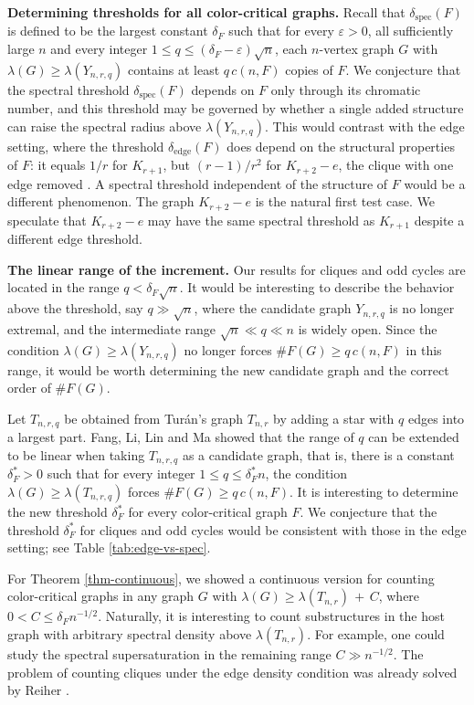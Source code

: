 \documentclass[11pt,a4paper]{article}
\theoremstyle{definition}
\theoremstyle{plain}
\newcommand{\eps}{\varepsilon}
\renewcommand{\le}{\leqslant}
\renewcommand{\ge}{\geqslant}
\begin{document}
\medskip
\noindent\textbf{Determining thresholds for all
color-critical graphs.} 
Recall that 
$\delta_{\mathrm{spec}}(F)$  is defined to be the largest constant $\delta_F$
such that for every $\eps>0$, all sufficiently large
$n$ and every integer $1\le q\le
(\delta_F -\eps)\sqrt n$, each $n$-vertex
graph $G$ with $\lambda(G)\ge\lambda(Y_{n,r,q})$ contains at
least $q\,c(n,F)$ copies of $F$. 
We conjecture that the spectral threshold $\delta_{\mathrm{spec}}(F)$ depends on $F$ only through its chromatic number, and 
this threshold may be governed by whether a single added structure can raise the spectral radius above $\lambda(Y_{n,r,q})$. 
This would contrast with the edge setting, where
the threshold $\delta_{\mathrm{edge}}(F)$ does depend on the  structural properties of $F$: it equals
$1/r$ for $K_{r+1}$, but $(r-1)/r^2$ for $K_{r+2}-e$, the clique with one edge removed \cite{PY2017}. 
A spectral threshold independent of the structure of $F$ 
would be a different phenomenon. 
The graph $K_{r+2}-e$ is
the natural first test case. 
We speculate that $K_{r+2}-e$ may have the same spectral threshold as $K_{r+1}$ despite a different edge threshold. 

\medskip
\noindent\textbf{The linear range of the increment.}
Our results for cliques and odd cycles are located in the range $q< \delta_{F} \sqrt n$. 
It would be interesting to describe the behavior above the threshold, say $q \gg  \sqrt n$, where the candidate graph $Y_{n,r,q}$ is no longer extremal, 
and the intermediate
range $\sqrt n\ll q\ll n$ is widely open. Since the
condition $\lambda(G)\ge\lambda(Y_{n,r,q})$ no longer forces $\texttt{\#}F(G)\ge q\,c(n,F)$ in this range, it would be worth determining the new 
candidate graph and the correct order of $\texttt{\#}F(G)$. 


Let $T_{n,r,q}$ be obtained from Tur\'{a}n's graph $T_{n,r}$ by adding a star with $q$ edges into a largest part. 
Fang, Li, Lin and Ma \cite[Theorem 7.2]{FLLM2025} showed that the range of $q$ can be extended to be linear when taking $T_{n,r,q}$ as a candidate graph, that is,  
there is a constant $\delta_F^*>0$ such that for every integer $1\le q\le\delta_F^*n$,
the condition $\lambda(G)\ge\lambda(T_{n,r,q})$ forces
$\texttt{\#}F(G)\ge q\,c(n,F)$. It is interesting to determine the new threshold $\delta_F^*$ for every color-critical graph $F$.  
We conjecture that the threshold $\delta_F^*$ for cliques and odd cycles would be consistent with those in the edge setting; see Table \ref{tab:edge-vs-spec}.  

For Theorem \ref{thm-continuous}, we showed a continuous version for counting color-critical graphs in any graph $G$ with $\lambda (G)\ge \lambda (T_{n,r}) \, +\, C$, where $0< C \le \delta_F {n}^{-1/2}$. Naturally, it is interesting to count substructures in the host graph with arbitrary  spectral density above $\lambda (T_{n,r})$. 
For example, one could study the spectral supersaturation in the remaining  range $C\gg {n}^{-1/2}$. 
The problem of counting cliques under the edge density condition was already solved by Reiher \cite{Rei2016}. 
\end{document}
